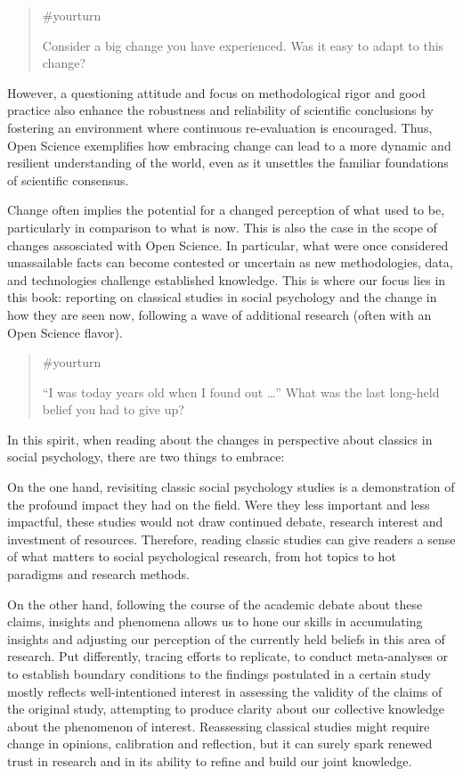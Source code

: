 \documentclass[
  letterpaper,
]{book}
\begin{document}
\begin{quote}
{\#yourturn}

Consider a big change you have experienced. Was it easy to adapt to this
change?
\end{quote}

However, a questioning attitude and focus on methodological rigor and
good practice also enhance the robustness and reliability of scientific
conclusions by fostering an environment where continuous re-evaluation
is encouraged. Thus, Open Science exemplifies how embracing change can
lead to a more dynamic and resilient understanding of the world, even as
it unsettles the familiar foundations of scientific consensus.

Change often implies the potential for a changed perception of what used
to be, particularly in comparison to what is now. This is also the case
in the scope of changes assosciated with Open Science. In particular,
what were once considered unassailable facts can become contested or
uncertain as new methodologies, data, and technologies challenge
established knowledge. This is where our focus lies in this book:
reporting on classical studies in social psychology and the change in
how they are seen now, following a wave of additional research (often
with an Open Science flavor).

\begin{quote}
{\#yourturn}

``I was today years old when I found out \ldots{}'' What was the last
long-held belief you had to give up?
\end{quote}

In this spirit, when reading about the changes in perspective about
classics in social psychology, there are two things to embrace:

On the one hand, revisiting classic social psychology studies is a
demonstration of the profound impact they had on the field. Were they
less important and less impactful, these studies would not draw
continued debate, research interest and investment of resources.
Therefore, reading classic studies can give readers a sense of what
matters to social psychological research, from hot topics to hot
paradigms and research methods.

On the other hand, following the course of the academic debate about
these claims, insights and phenomena allows us to hone our skills in
accumulating insights and adjusting our perception of the currently held
beliefs in this area of research. Put differently, tracing efforts to
replicate, to conduct meta-analyses or to establish boundary conditions
to the findings postulated in a certain study mostly reflects
well-intentioned interest in assessing the validity of the claims of the
original study, attempting to produce clarity about our collective
knowledge about the phenomenon of interest. Reassessing classical
studies might require change in opinions, calibration and reflection,
but it can surely spark renewed trust in research and in its ability to
refine and build our joint knowledge.
\end{document}
